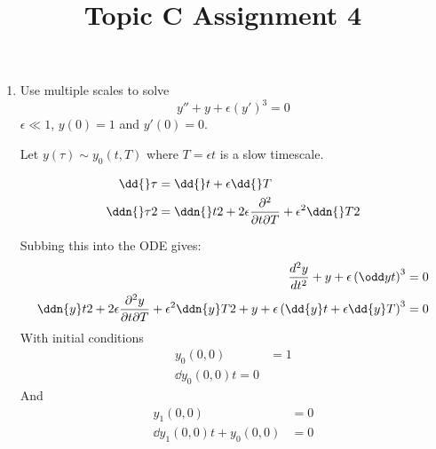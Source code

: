 \documentclass{X:/Documents/Coding/Latex/myassignment}
\title{Topic C Assignment 4}
\begin{document}
\maketitle

\begin{enumerate}
	\item Use multiple scales to solve
	\[y'' + y + \epsilon(y')^3 = 0\]
	$\epsilon \ll 1$, $y(0)=1$ and $y'(0) = 0$. 

	Let $y(\tau) \sim y_0(t,T)$ where $T=\epsilon t$ is a slow timescale.
	
	
	\begin{align*}
		\dd{}\tau &= \dd{} t + \epsilon\dd{}T\\
		\ddn{}\tau2 &= \ddn{} t2 + 2\epsilon\frac{\partial^2}{\partial t \partial T} + \epsilon^2 \ddn{}T2
	\end{align*}

	Subbing this into the ODE gives:
	\begin{align*}
		\frac{d^2y}{dt^2} + y + \epsilon\left(\odd yt\right)^3 = 0\\
		\ddn{y} t2 + 2\epsilon\frac{\partial^2y}{\partial t \partial T} + \epsilon^2 \ddn{y}T2 + y + \epsilon\left(\dd{y} t + \epsilon\dd{y}T\right)^3 =0 
	\end{align*}
	With initial conditions
	\begin{align*}
		y_0(0,0) &= 1\\
		\dd{y_0(0,0)}{t} = 0 
	\end{align*}
	And
	\begin{align*}
		y_1(0,0) &= 0 \\
		\dd{y_1(0,0)}{t} + y_0(0,0) &= 0
	\end{align*}


\end{enumerate}
\end{document}
